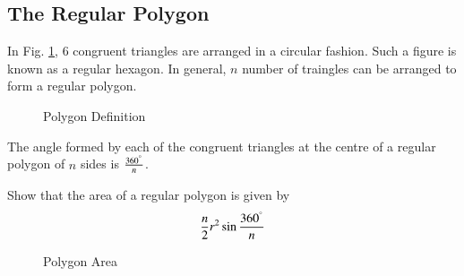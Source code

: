 \subsection{The Regular Polygon}
%

\begin{definition}
	In Fig. \ref{ch5_polygon_def}, 6 congruent triangles are arranged in a circular fashion.  Such a figure is known as a regular hexagon.  In general, $n$ number of traingles can be arranged to form a regular polygon.
\end{definition}
\begin{figure}[!ht]
	\begin{center}
		
		\resizebox{\columnwidth}{!}{}
	\end{center}
	\caption{Polygon Definition}
	\label{ch5_polygon_def}	
\end{figure}
%
\begin{definition}
The angle formed by each of the congruent triangles at the centre of a regular polygon of $n$ sides is $\frac{360^{\degree}}{n}$.
\end{definition}
%
\begin{problem}
Show that the area of a regular polygon is given by 
%
\begin{equation}
\frac{n}{2}r^{2}\sin\frac{360^{\degree}}{n}
\end{equation}
%
\end{problem}
\begin{figure}[!ht]
	\begin{center}
		
		\resizebox{\columnwidth}{!}{}
	\end{center}
	\caption{Polygon Area}
	\label{ch5_polygon_area}	
\end{figure}
%

